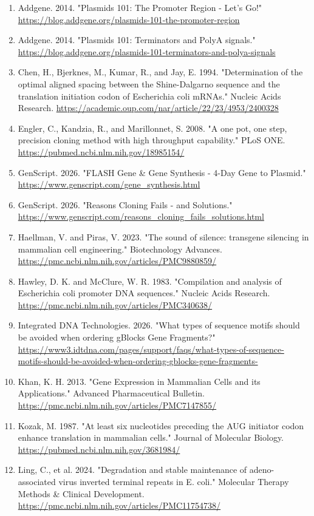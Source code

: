 \documentclass[11pt]{report}
\begin{document}
\begin{enumerate}
\item Addgene. 2014. "Plasmids 101: The Promoter Region - Let's Go!" \url{https://blog.addgene.org/plasmids-101-the-promoter-region}
\item Addgene. 2014. "Plasmids 101: Terminators and PolyA signals." \url{https://blog.addgene.org/plasmids-101-terminators-and-polya-signals}
\item Chen, H., Bjerknes, M., Kumar, R., and Jay, E. 1994. "Determination of the optimal aligned spacing between the Shine-Dalgarno sequence and the translation initiation codon of Escherichia coli mRNAs." Nucleic Acids Research. \url{https://academic.oup.com/nar/article/22/23/4953/2400328}
\item Engler, C., Kandzia, R., and Marillonnet, S. 2008. "A one pot, one step, precision cloning method with high throughput capability." PLoS ONE. \url{https://pubmed.ncbi.nlm.nih.gov/18985154/}
\item GenScript. 2026. "FLASH Gene \& Gene Synthesis - 4-Day Gene to Plasmid." \url{https://www.genscript.com/gene_synthesis.html}
\item GenScript. 2026. "Reasons Cloning Fails - and Solutions." \url{https://www.genscript.com/reasons_cloning_fails_solutions.html}
\item Haellman, V. and Piras, V. 2023. "The sound of silence: transgene silencing in mammalian cell engineering." Biotechnology Advances. \url{https://pmc.ncbi.nlm.nih.gov/articles/PMC9880859/}
\item Hawley, D. K. and McClure, W. R. 1983. "Compilation and analysis of Escherichia coli promoter DNA sequences." Nucleic Acids Research. \url{https://pmc.ncbi.nlm.nih.gov/articles/PMC340638/}
\item Integrated DNA Technologies. 2026. "What types of sequence motifs should be avoided when ordering gBlocks Gene Fragments?" \url{https://www3.idtdna.com/pages/support/faqs/what-types-of-sequence-motifs-should-be-avoided-when-ordering-gblocks-gene-fragments-}
\item Khan, K. H. 2013. "Gene Expression in Mammalian Cells and its Applications." Advanced Pharmaceutical Bulletin. \url{https://pmc.ncbi.nlm.nih.gov/articles/PMC7147855/}
\item Kozak, M. 1987. "At least six nucleotides preceding the AUG initiator codon enhance translation in mammalian cells." Journal of Molecular Biology. \url{https://pubmed.ncbi.nlm.nih.gov/3681984/}
\item Ling, C., et al. 2024. "Degradation and stable maintenance of adeno-associated virus inverted terminal repeats in E. coli." Molecular Therapy Methods \& Clinical Development. \url{https://pmc.ncbi.nlm.nih.gov/articles/PMC11754738/}

\end{enumerate}
\end{document}
